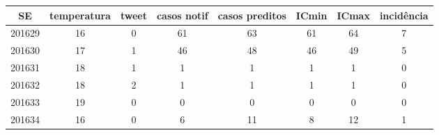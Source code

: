 \begin{tabular}{c|ccccccc}
  \hline
SE & temperatura & tweet & casos notif & casos preditos & ICmin & ICmax & incidência \\ 
  \hline
201629 & 16 & 0 & 61 & 63 & 61 & 64 & 7 \\ 
  201630 & 17 & 1 & 46 & 48 & 46 & 49 & 5 \\ 
  201631 & 18 & 1 & 1 & 1 & 1 & 1 & 0 \\ 
  201632 & 18 & 2 & 1 & 1 & 1 & 1 & 0 \\ 
  201633 & 19 & 0 & 0 & 0 & 0 & 0 & 0 \\ 
  201634 & 16 & 0 & 6 & 11 & 8 & 12 & 1 \\ 
   \hline
\end{tabular}
